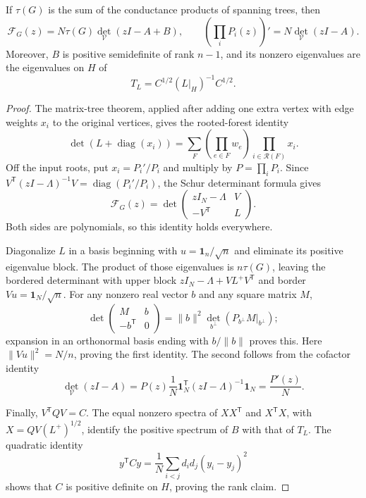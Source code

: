 \begin{lemma}\label{gm:lem:compression}
If $\tau(G)$ is the sum of the conductance products of spanning trees, then
\[
 \mathcal F_G(z)=N\tau(G)\det_{\mathcal V}(zI-A+B),\qquad
 \left(\prod_iP_i(z)\right)'=N\det_{\mathcal V}(zI-A).
\]
Moreover, $B$ is positive semidefinite of rank $n-1$, and its nonzero
eigenvalues are the eigenvalues on $H$ of
\begin{equation}\label{gm:eq:reducedB}
 T_L=C^{1/2}(L|_H)^{-1}C^{1/2}.
\end{equation}
\end{lemma}

\begin{proof}
The matrix-tree theorem, applied after adding one extra vertex with edge
weights $x_i$ to the original vertices, gives the rooted-forest identity
\[
 \det(L+\operatorname{diag}(x_i))
 =\sum_F\left(\prod_{e\in F}w_e\right)
              \prod_{i\in\mathcal R(F)}x_i.
\]
Off the input roots, put $x_i=P_i'/P_i$ and multiply by
$P=\prod_iP_i$. Since
$V^{\mathsf T}(zI-\Lambda)^{-1}V=\operatorname{diag}(P_i'/P_i)$,
the Schur determinant formula gives
\[
 \mathcal F_G(z)=
 \det\begin{pmatrix}zI_N-\Lambda&V\\-V^{\mathsf T}&L\end{pmatrix}.
\]
Both sides are polynomials, so this identity holds everywhere.

Diagonalize $L$ in a basis beginning with
$u=\mathbf1_n/\sqrt n$ and eliminate its positive eigenvalue block.
The product of those eigenvalues is $n\tau(G)$, leaving the bordered
determinant with upper block
$zI_N-\Lambda+VL^+V^{\mathsf T}$ and border
$Vu=\mathbf1_N/\sqrt n$. For any nonzero real vector $b$ and any square
matrix $M$,
\[
 \det\begin{pmatrix}M&b\\-b^{\mathsf T}&0\end{pmatrix}
 =\|b\|^2\det_{b^\perp}(P_{b^\perp}M|_{b^\perp});
\]
expansion in an orthonormal basis ending with $b/\|b\|$ proves this.
Here $\|Vu\|^2=N/n$, proving the first identity.
The second follows from the cofactor identity
\[
 \det_{\mathcal V}(zI-A)
 =P(z)\frac1N\mathbf1_N^{\mathsf T}(zI-\Lambda)^{-1}\mathbf1_N
 =\frac{P'(z)}N.
\]

Finally, $V^{\mathsf T}QV=C$. The equal nonzero spectra of
$XX^{\mathsf T}$ and $X^{\mathsf T}X$, with
$X=QV(L^+)^{1/2}$, identify the positive spectrum of $B$ with that of
$T_L$. The quadratic identity
\[
 y^{\mathsf T}Cy=\frac1N\sum_{i<j}d_id_j(y_i-y_j)^2
\]
shows that $C$ is positive definite on $H$, proving the rank claim.
\end{proof}

